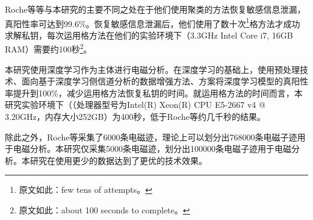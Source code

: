 {{{	%
	
	
	Roche等\citep{Roche21}等与本研究的主要不同之处在于他们使用聚类的方法恢复敏感信息泄漏，真阳性率可达到99.6\%。恢复敏感信息泄漏后，他们使用了数十次\footnote{原文如此：few tens of attempts。}格方法才成功求解私钥，每次运用格方法在他们的实验环境下（3.3GHz Intel Core i7, 16GB RAM）需要约100秒\footnote{原文如此：about 100 seconds to complete。}。
	
	
	本研究使用深度学习作为主体进行电磁分析。在深度学习的基础上，使用\yuchuli 预处理技术、面向基于深度学习侧信道分析的数据增强方法、\jiashejianyanguji 方案将深度学习模型的真阳性率提升到100\%，减少运用格方法恢复私钥的时间。就运用格方法的时间而言，本研究实验环境下（（处理器型号为Intel(R) Xeon(R) CPU E5-2667 v4 @ 3.20GHz，内存大小252GB）为400秒，低于Roche等\citep{Roche21}约几千秒的结果。
	
	除此之外，Roche等\citep{Roche21}采集了6000条电磁迹，理论上可以划分出768000条电磁子迹用于电磁分析。本研究仅采集5000条电磁迹，划分出100000条电磁子迹用于电磁分析。本研究在使用更少的数据达到了更优的技术效果。
	
	}

}}
